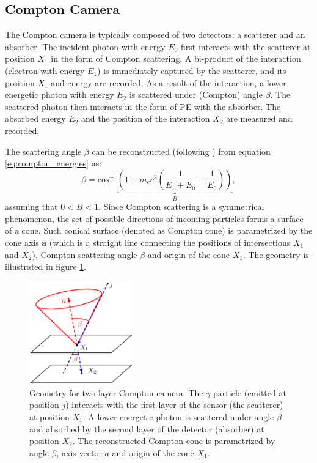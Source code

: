 \subsection{Compton Camera}%
The Compton camera is typically composed of two detectors: a scatterer and an absorber.
The incident photon with energy $E_{0}$ first interacts with the scatterer at position $X_{1}$ in the form of Compton scattering.
A bi-product of the interaction (electron with energy $E_{1}$) is immediately captured by the scatterer, and its position $X_{1}$ and energy are recorded.
As a result of the interaction, a lower energetic photon with energy $E_{2}$ is scattered under (Compton) angle $\beta$.
The scattered photon then interacts in the form of \ac{PE} with the absorber.
The absorbed energy $E_{2}$ and the position of the interaction $X_{2}$ are measured and recorded.

The scattering angle $\beta$ can be reconstructed (following \cite{baca2021gamma}) from equation \ref{eq:compton_energies} as:
\begin{equation}
  \beta = \mathrm{cos}^{-1} 
  \underset{B}{\underbrace{\left (
   1+m_{e}c^{2} \left( \frac{1}{E_{1}+E_{0}} - \frac{1}{E_{0}}\right )  \right )
  }},
    \label{eq:compton_beta_formula}
\end{equation}
assuming that $0<B<1$.
Since Compton scattering is a symmetrical phenomenon,  the set of possible directions of incoming particles forms a surface of a cone.
Such conical surface (denoted as Compton cone) is parametrized by the cone axis $\mathbf{a}$ (which is a straight line connecting the positions of intersections $X_{1}$ and $X_{2}$), Compton scattering angle $\beta$ and origin of the cone $X_{1}$.
The geometry is illustrated in figure \ref{fig:compton_camera_geometry}.

\begin{figure}[!h]
  \centering
    \includegraphics[width=0.4\textwidth]{./fig/photos/compton_camera_modelll.eps}
    \caption{Geometry for two-layer Compton camera. The $\gamma$ particle (emitted at position $j$) interacts with the first layer of the sensor (the scatterer) at position $X_{1}$. A lower energetic photon is scattered under angle $\beta$ and absorbed by the second layer of the detector (absorber) at position $X_{2}$. The reconstructed Compton cone is parametrized by angle $\beta$, axis vector $a$ and origin of the cone $X_{1}$.}
    \label{fig:compton_camera_geometry}
\end{figure}
